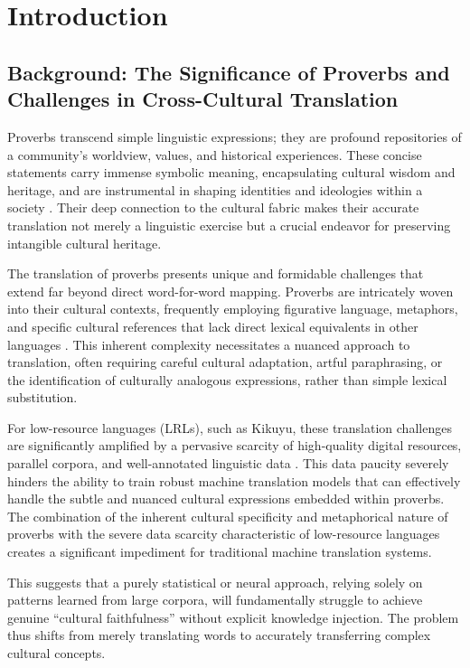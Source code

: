 \documentclass[12pt]{article}
\let\cite\textcite  %
\begin{document}
\section{Introduction}

\subsection{Background: The Significance of Proverbs and Challenges in Cross-Cultural Translation}

Proverbs transcend simple linguistic expressions; they are profound repositories of a community's worldview, values, and historical experiences. These concise statements carry immense symbolic meaning, encapsulating cultural wisdom and heritage, and are instrumental in shaping identities and ideologies within a society \cite{smith2023cultural}. Their deep connection to the cultural fabric makes their accurate translation not merely a linguistic exercise but a crucial endeavor for preserving intangible cultural heritage.

The translation of proverbs presents unique and formidable challenges that extend far beyond direct word-for-word mapping. Proverbs are intricately woven into their cultural contexts, frequently employing figurative language, metaphors, and specific cultural references that lack direct lexical equivalents in other languages \cite{brown2023figurative}. This inherent complexity necessitates a nuanced approach to translation, often requiring careful cultural adaptation, artful paraphrasing, or the identification of culturally analogous expressions, rather than simple lexical substitution.

For low-resource languages (LRLs), such as Kikuyu, these translation challenges are significantly amplified by a pervasive scarcity of high-quality digital resources, parallel corpora, and well-annotated linguistic data \cite{li2024rag, datacamp2024kg}. This data paucity severely hinders the ability to train robust machine translation models that can effectively handle the subtle and nuanced cultural expressions embedded within proverbs. The combination of the inherent cultural specificity and metaphorical nature of proverbs with the severe data scarcity characteristic of low-resource languages creates a significant impediment for traditional machine translation systems.

This suggests that a purely statistical or neural approach, relying solely on patterns learned from large corpora, will fundamentally struggle to achieve genuine ``cultural faithfulness'' without explicit knowledge injection. The problem thus shifts from merely translating words to accurately transferring complex cultural concepts.
\end{document}
